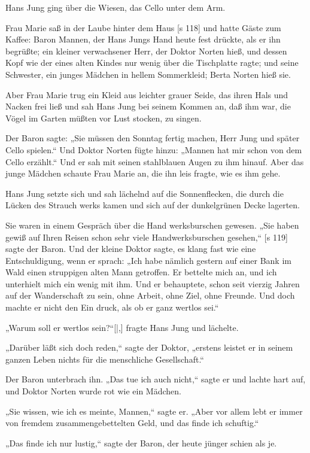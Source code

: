 Hans Jung ging über die Wiesen, das Cello
unter dem Arm.

Frau Marie saß in der Laube hinter dem Haus
[s 118]
und hatte Gäste zum Kaffee: Baron Mannen, der
Hans Jungs Hand heute fest drückte, als er ihn
begrüßte; ein kleiner verwachsener Herr, der Doktor
Norten hieß, und dessen Kopf wie der eines alten
Kindes nur wenig über die Tischplatte ragte; und
seine Schwester, ein junges Mädchen in hellem
Sommerkleid; Berta Norten hieß sie.

Aber Frau Marie trug ein Kleid aus leichter
grauer Seide, das ihren Hals und Nacken frei ließ
und sah Hans Jung bei seinem Kommen an, daß
ihm war, die Vögel im Garten müßten vor Lust
stocken, zu singen.

Der Baron sagte: „Sie müssen den Sonntag
fertig machen, Herr Jung und später Cello spielen.“
Und Doktor Norten fügte hinzu: „Mannen hat mir
schon von dem Cello erzählt.“ Und er sah mit
seinen stahlblauen Augen zu ihm hinauf. Aber das
junge Mädchen schaute Frau Marie an, die ihn leis
fragte, wie es ihm gehe.

Hans Jung setzte sich und sah lächelnd auf die
Sonnenflecken, die durch die Lücken des Strauch­
werks kamen und sich auf der dunkelgrünen Decke
lagerten.

Sie waren in einem Gespräch über die Hand­
werksburschen gewesen. „Sie haben gewiß auf Ihren
Reisen schon sehr viele Handwerksburschen gesehen,“
[s 119]
sagte der Baron. Und der kleine Doktor sagte, es
klang fast wie eine Entschuldigung, wenn er sprach:
„Ich habe nämlich gestern auf einer Bank im Wald
einen struppigen alten Mann getroffen. Er bettelte
mich an, und ich unterhielt mich ein wenig mit ihm.
Und er behauptete, schon seit vierzig Jahren auf
der Wanderschaft zu sein, ohne Arbeit, ohne Ziel,
ohne Freunde. Und doch machte er nicht den Ein­
druck, als ob er ganz wertlos sei.“

„Warum soll er wertlos sein?“[|,] fragte Hans Jung
und lächelte.

„Darüber läßt sich doch reden,“ sagte der
Doktor, „erstens leistet er in seinem ganzen Leben
nichts für die menschliche Gesellschaft.“

Der Baron unterbrach ihn. „Das tue ich auch
nicht,“ sagte er und lachte hart auf, und Doktor
Norten wurde rot wie ein Mädchen.

„Sie wissen, wie ich es meinte, Mannen,“ sagte
er. „Aber vor allem lebt er immer von fremdem
zusammengebettelten Geld, und das finde ich schuftig.“

„Das finde ich nur lustig,“ sagte der Baron, der
heute jünger schien als je.

